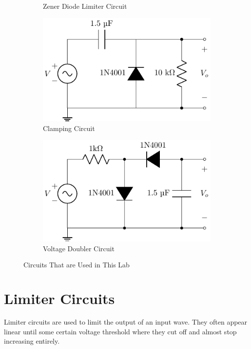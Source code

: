 \documentclass{../../ece-report}
\begin{document}
\begin{figure}[h!]
\begin{subfigure}{.45\textwidth}
    \caption{Zener Diode Limiter Circuit}
    \label{fig:circuit_b}
  \end{subfigure}
  \begin{subfigure}{.45\textwidth}
    \includegraphics[width=\textwidth]{../circuits/circuit_c.pdf}
    \caption{Clamping Circuit}
    \label{fig:circuit_c}
  \end{subfigure}
  \begin{subfigure}{.45\textwidth}
    \includegraphics[width=\textwidth]{../circuits/circuit_d.pdf}
    \caption{Voltage Doubler Circuit}
    \label{fig:circuit_d}
  \end{subfigure}
  \caption{Circuits That are Used in This Lab}
  \label{fig:ciruits}
\end{figure}

\section{Limiter Circuits}

Limiter circuits are used to limit the output of an
input wave. They often appear linear until some certain
voltage threshold where they cut off and almost stop
increasing entirely.
\end{document}
